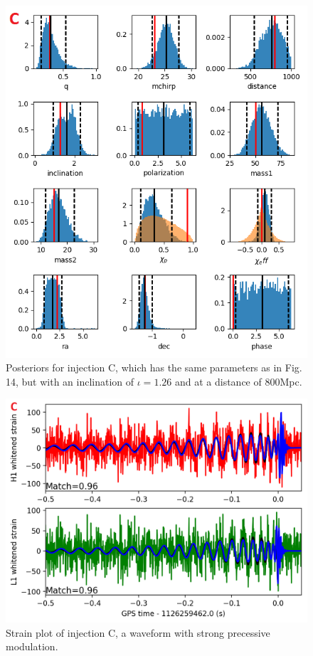 \documentclass[11pt]{article}
\begin{document}
\begin{figure}[H]
	\includegraphics[width=1\textwidth]{fig17.png}
	\centering
	\caption{Posteriors for injection C, which has the same parameters as in Fig. 14, but with an inclination of $\iota=1.26$ and at a distance of 800Mpc.}
	\centering
\end{figure}
\begin{figure}[H]
	\includegraphics[scale=0.3]{fig18.png}
	\centering
	\caption{Strain plot of injection C, a waveform with strong precessive modulation.}
	\centering
\end{figure}
\end{document}
